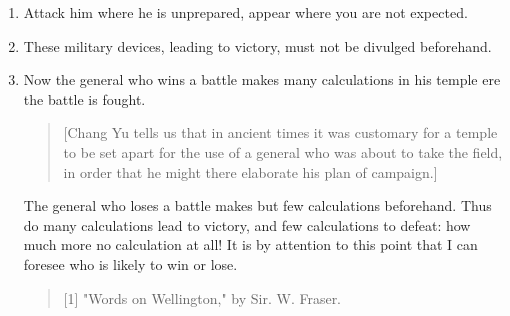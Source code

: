 \documentclass[10pt,a4paper]{book}
\begin{document}
\begin{enumerate}[leftmargin=*, label=\arabic*., resume]
{\small
\begin{quote}
[Less plausible is the interpretation favoured by most of the commentators: "If sovereign and subject are in accord, put division between them."]
\end{quote}
}

\item Attack him where he is unprepared, appear where you are not expected.

\item These military devices, leading to victory, must not be divulged beforehand.

\item Now the general who wins a battle makes many calculations in his temple ere the battle is fought.

{\small
\begin{quote}
[Chang Yu tells us that in ancient times it was customary for a temple to be set apart for the use of a general who was about to take the field, in order that he might there elaborate his plan of campaign.]
\end{quote}
}

The general who loses a battle makes but few calculations beforehand. Thus do many calculations lead to victory, and few calculations to defeat: how much more no calculation at all! It is by attention to this point that I can foresee who is likely to win or lose.

{\small
\begin{quote}
[1] "Words on Wellington," by Sir. W. Fraser.
\end{quote}
}

\end{enumerate}
\end{document}
